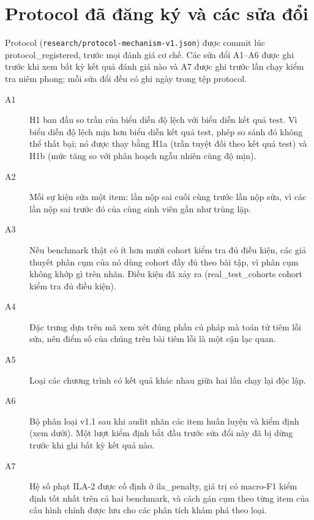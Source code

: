 \section{Protocol đã đăng ký và các sửa đổi}\label{app:protocol}

Protocol (\texttt{research/protocol-mechanism-v1.json}) được commit lúc {{protocol_registered}}, trước mọi đánh giá cơ chế. Các sửa đổi A1--A6 được ghi trước khi xem bất kỳ kết quả đánh giá nào và A7 được ghi trước lần chạy kiểm tra niêm phong; mỗi sửa đổi đều có ghi ngày trong tệp protocol.
\begin{description}
\item[A1] H1 ban đầu so trần của biểu diễn độ lệch với biểu diễn kết quả test. Vì biểu diễn độ lệch mịn hơn biểu diễn kết quả test, phép so sánh đó không thể thất bại; nó được thay bằng H1a (trần tuyệt đối theo kết quả test) và H1b (mức tăng so với phân hoạch ngẫu nhiên cùng độ mịn).
\item[A2] Mỗi sự kiện sửa một item: lần nộp sai cuối cùng trước lần nộp sửa, vì các lần nộp sai trước đó của cùng sinh viên gần như trùng lặp.
\item[A3] Nếu benchmark thật có ít hơn mười cohort kiểm tra đủ điều kiện, các giả thuyết phân cụm của nó dùng cohort đầy đủ theo bài tập, vì phân cụm không khớp gì trên nhãn. Điều kiện đã xảy ra ({{real_test_cohorts}} cohort kiểm tra đủ điều kiện).
\item[A4] Đặc trưng dựa trên mã xem xét đúng phần cú pháp mà toán tử tiêm lỗi sửa, nên điểm số của chúng trên bài tiêm lỗi là một cận lạc quan.
\item[A5] Loại các chương trình có kết quả khác nhau giữa hai lần chạy lại độc lập.
\item[A6] Bộ phân loại v1.1 sau khi audit nhãn các item huấn luyện và kiểm định (xem dưới). Một lượt kiểm định bắt đầu trước sửa đổi này đã bị dừng trước khi ghi bất kỳ kết quả nào.
\item[A7] Hệ số phạt ILA-2 được cố định ở {{ila_penalty}}, giá trị có macro-F1 kiểm định tốt nhất trên cả hai benchmark, và cách gán cụm theo từng item của cấu hình chính được lưu cho các phân tích khám phá theo loại.
\end{description}


